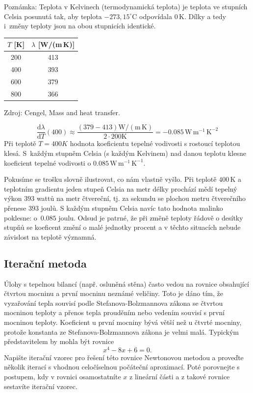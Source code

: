 {\footnotesize Poznámka: Teplota v Kelvinech (termodynamická teplota) je teplota ve stupních Celsia posunutá tak, aby teplota $-273{,}15^\circ\mathrm C$ odpovídala $0\,\mathrm K$. Dílky a tedy i~změny teploty jsou na obou stupnicích identické.

  }

{\centering 
\begin{tabular}{cc}
  $T$ [K] & $\lambda$ [W/(m\,K)]\\
  \hline
  200 & 413 \\
  400 & 393 \\
  600 & 379 \\
  800 & 366 \\
\end{tabular}

{\footnotesize Zdroj: Cengel, Mass and heat transfer.}

}
\reseni

$$\frac{\mathrm d\lambda}{\mathrm dT}(400) \approx \frac{(379 -413) \mathrm {W}/(\mathrm m\,\mathrm K)}{2\cdot 200\mathrm K}=-0.085\,\mathrm W \,\mathrm m^{-1}\,\mathrm K^{-2}$$
Při teplotě $T=400 K$ hodnota koeficientu tepelné vodivosti s rostoucí teplotou klesá. S~každým stupněm Celsia (s každým Kelvinem) nad danou teplotu klesne koeficient tepelné vodivosti o $0.085\,\mathrm W \,\mathrm m^{-1}\,\mathrm K^{-1}$.

Pokusíme se trošku slovně ilustrovat, co nám vlastně vyšlo. Při teplotě $400\,\mathrm K$ a teplotním gradientu jeden stupeň Celsia na metr délky prochází mědí tepelný výkon $393$ wattů na metr čtvereční, tj. za sekundu se plochou metru čtverečního přenese $393$ joulů. S každým stupněm Celsia navíc tato hodnota malinko poklesne: o~$0.085$ joulu. Odsud je patrné, že při změně teploty řádově o desítky stupňů se koeficent změní o malé jednotky procent a v těchto situacích nebude závislost na teplotě významná. 
\konec


\stranka

\subsection{Iterační metoda}


Úlohy s tepelnou bilancí (např. osluněná stěna) často vedou na rovnice obsahující čtvrtou mocninu  a první mocninu neznámé veličiny. Toto je dáno tím, že vyzařování tepla souvisí podle Stefanova-Bolzmannova zákona se čtvrtou mocninou teploty  a přenos tepla prouděním nebo vedením souvisí s první mocninou teploty.
Koeficient u první mocniny bývá větší než u čtvrté mocniny, protože konstanta ze Stefanova-Bolzmannova zákona je velmi malá. Typickým představitelem by mohla být rovnice $$x^4-8x+6=0.$$
Napište iterační vzorec pro řešení této rovnice Newtonovou metodou a proveďte několik iterací s vhodnou celočíselnou počáteční aproximací. Poté porovnejte s postupem, kdy v rovnici osamostatníte $x$ z lineární části a z takové rovnice sestavíte iterační vzorec.


